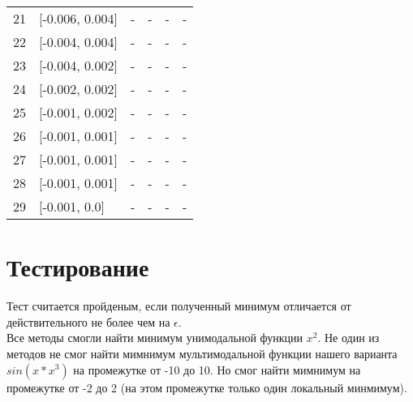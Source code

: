\documentclass[fleqn]{article}
\begin{document}
\begin{table}[p]
\begin{tabular}{rlllll}
21 & [-0.006, 0.004] & - & - & - & - \\
22 & [-0.004, 0.004] & - & - & - & - \\
23 & [-0.004, 0.002] & - & - & - & - \\
24 & [-0.002, 0.002] & - & - & - & - \\
25 & [-0.001, 0.002] & - & - & - & - \\
26 & [-0.001, 0.001] & - & - & - & - \\
27 & [-0.001, 0.001] & - & - & - & - \\
28 & [-0.001, 0.001] & - & - & - & - \\
29 & [-0.001, 0.0] & - & - & - & - \\
\end{tabular}

\end{table}

\section{Тестирование}
Тест считается пройденым, если полученный минимум отличается
от действительного не более чем на $\epsilon$.\\
Все методы смогли найти минимум унимодальной функции $x^2$.
Не один из методов не смог найти мимнимум мультимодальной функции
нашего варианта $sin(x*x^3)$ на промежутке от -10 до 10. Но
смог найти мимнимум на промежутке от -2 до 2 (на этом промежутке только один
локальный минмимум).
\end{document}
